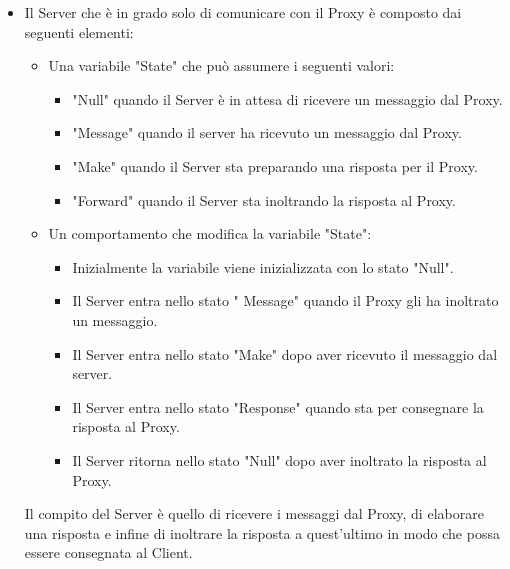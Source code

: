 \documentclass[13pt,a4paper]{article}
\begin{document}
\begin{itemize}
		\item Il Server che è in grado solo di comunicare con il Proxy è composto dai seguenti elementi:
		\begin{itemize}
			\item Una variabile "State" che può assumere i seguenti valori:
			\begin{itemize}
				\item "Null" quando il Server è in attesa di ricevere un messaggio dal Proxy.
				\item "Message" quando il server ha ricevuto un messaggio dal Proxy.
				\item "Make" quando il Server sta preparando una risposta per il Proxy.
				\item "Forward" quando il Server sta inoltrando la risposta al Proxy.
			\end{itemize}
			\item Un comportamento che modifica la variabile "State":
			\begin{itemize}
				\item Inizialmente la variabile viene inizializzata con lo stato "Null".
				\item Il Server entra nello stato " Message" quando il Proxy gli ha inoltrato un messaggio.
				\item Il Server entra nello stato "Make" dopo aver ricevuto il messaggio dal server.
				\item Il Server entra nello stato "Response" quando sta per consegnare la risposta al Proxy.
				\item Il Server ritorna nello stato "Null" dopo aver inoltrato la risposta al Proxy.
			\end{itemize}
		\end{itemize}
		Il compito del Server è quello di ricevere i messaggi dal Proxy, di elaborare una risposta e infine di inoltrare la risposta a quest'ultimo in modo che possa essere consegnata al Client.
	\end{itemize}
	
\end{document}
